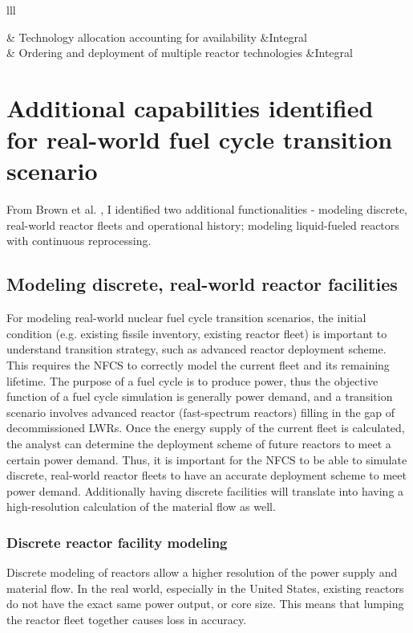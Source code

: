 \begin{table}[h]
\begin{tabular}{lll}
        \hline

         & Technology allocation accounting for availability &Integral \\
        	& Ordering and deployment of multiple reactor technologies &Integral \\
        \hline
    \end{tabular}
\end{table}

\section{Additional capabilities identified for real-world fuel cycle transition scenario}
From Brown et al. \cite{brown_identification_2016}, I identified two additional functionalities -
modeling discrete, real-world reactor fleets and operational history; modeling liquid-fueled
reactors with continuous reprocessing.

\subsection{Modeling discrete, real-world reactor facilities}
For modeling real-world nuclear fuel cycle transition scenarios, the initial
condition (e.g. existing fissile inventory, existing reactor fleet) is important
to understand transition strategy, such as advanced reactor deployment
scheme. This requires the \gls{NFCS} to correctly model the current fleet and its
remaining lifetime. The purpose of a fuel cycle is to produce power, thus the objective
function of a fuel cycle simulation is generally power demand, and a transition
scenario involves advanced reactor (fast-spectrum reactors) filling in the
gap of decommissioned \glspl{LWR}.
Once the energy supply of the current fleet is calculated,
the analyst can determine the deployment scheme of future reactors to meet a certain
power demand. Thus, it is important for the \gls{NFCS} to be able to simulate
discrete, real-world reactor fleets to have an accurate deployment scheme to
meet power demand. Additionally having discrete facilities will translate into
having a high-resolution calculation of the material flow as well.

\subsubsection{Discrete reactor facility modeling}
Discrete modeling of reactors allow a higher resolution of the power supply and
material flow. In the real world, especially in the United States, existing
reactors do not have the exact same power output, or core size. This means that
lumping the reactor fleet together causes loss in accuracy.

